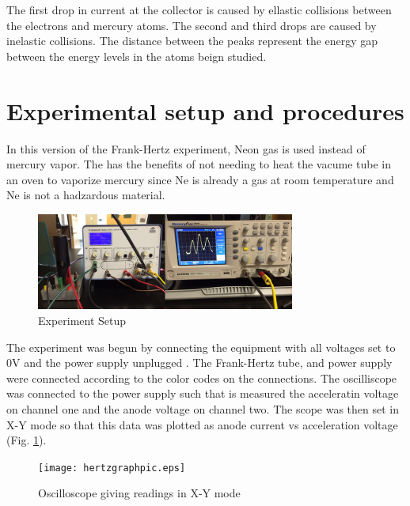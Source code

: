 \documentclass[twocolumn,secnumarabic,amssymb, nobibnotes, aps, pra]{revtex4}
\begin{document}
The first drop in current at the collector is caused by ellastic collisions between the electrons and mercury atoms.  The second and third drops are caused by inelastic collisions.  The distance between the peaks represent the energy gap between the energy levels in the atoms beign studied.

\section{Experimental setup and procedures}

In this version of the Frank-Hertz experiment, Neon gas is used instead of mercury vapor.  The has the benefits of not needing to heat the vacume tube in an oven to vaporize mercury since Ne is already a gas at room temperature and Ne is not a hadzardous material.  

\begin{figure} [h]  %
\begin{center}
\includegraphics[width=85mm]{setup.jpg} 
\end{center}
\caption{Experiment Setup}
\label{fig:setup}
\end{figure}

The experiment was begun by connecting the equipment with all voltages set to 0V and the power supply unplugged .  The Frank-Hertz tube, and power supply were connected according to the color codes on the connections.  The oscilliscope was connected to the power supply such that is measured the acceleratin voltage on channel one and the anode voltage on channel two.  The scope was then set in X-Y mode so that this data was plotted as anode current vs acceleration voltage (Fig. \ref{fig:setup}).  

\begin{figure} [h]  %
\begin{center}
\texttt{[image: hertzgraphpic.eps]} 
\end{center}
\caption{Oscilloscope giving readings in X-Y mode}
\label{fig:pic}
\end{figure}
\end{document}
